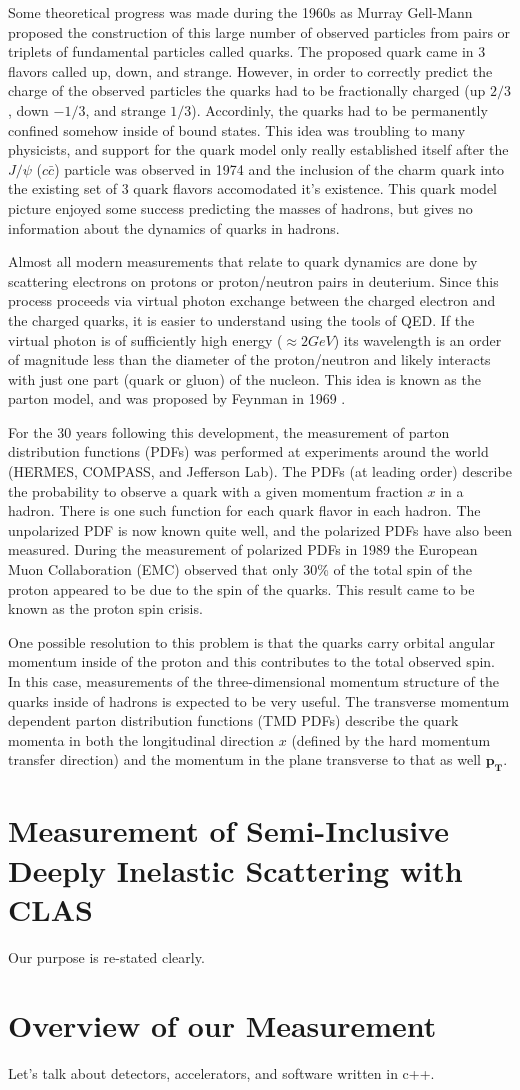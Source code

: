 Some theoretical progress was made during the 1960s as Murray Gell-Mann proposed the construction of this large number of observed particles from pairs or triplets of fundamental particles called quarks.  The proposed quark came in 3 flavors called up, down, and strange.  However, in order to correctly predict the charge of the observed particles the quarks had to be fractionally charged (up $2/3$, down $-1/3$, and strange $1/3$).  Accordinly, the quarks had to be permanently confined somehow inside of bound states.  This idea was troubling to many physicists, and support for the quark model only really established itself after the $J/\psi$ ($c \bar{c}$) particle was observed in 1974 and the inclusion of the charm quark into the existing set of 3 quark flavors accomodated it's existence.  This quark model picture enjoyed some success predicting the masses of hadrons, but gives no information about the dynamics of quarks in hadrons.

Almost all modern measurements that relate to quark dynamics are done by scattering electrons on protons or proton/neutron pairs in deuterium.  Since this process proceeds via virtual photon exchange between the charged electron and the charged quarks, it is easier to understand using the tools of QED.  If the virtual photon is of sufficiently high energy ($\approx 2 GeV$) its wavelength is an order of magnitude less than the diameter of the proton/neutron and likely interacts with just one part (quark or gluon) of the nucleon.  This idea is known as the parton model, and was proposed by Feynman in 1969 \cite{physics-feynman-1969}.

For the 30 years following this development, the measurement of parton distribution functions (PDFs) was performed at experiments around the world (HERMES, COMPASS, and Jefferson Lab).  The PDFs (at leading order) describe the probability to observe a quark with a given momentum fraction $x$ in a hadron.  There is one such function for each quark flavor in each hadron.  The unpolarized PDF is now known quite well, and the polarized PDFs have also been measured.  During the measurement of polarized PDFs in 1989 the European Muon Collaboration (EMC) observed that only 30\% of the total spin of the proton appeared to be due to the spin of the quarks.  This result came to be known as the proton spin crisis.  

One possible resolution to this problem is that the quarks carry orbital angular momentum inside of the proton and this contributes to the total observed spin.  In this case, measurements of the three-dimensional momentum structure of the quarks inside of hadrons is expected to be very useful.  The transverse momentum dependent parton distribution functions (TMD PDFs) describe the quark momenta in both the longitudinal direction $x$ (defined by the hard momentum transfer direction) and the momentum in the plane transverse to that as well $\mathbf{p_T}$.  

\section{Measurement of Semi-Inclusive Deeply Inelastic Scattering with CLAS}
Our purpose is re-stated clearly.

\section{Overview of our Measurement}
Let's talk about detectors, accelerators, and software written in c++. 

